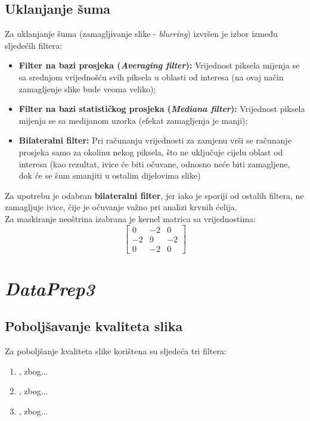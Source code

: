 \documentclass[12pt,a4paper]{article}
\begin{document}
\subsection{Uklanjanje šuma}

Za uklanjanje šuma (zamagljivanje slike - \textit{blurring}) izvršen je izbor između sljedećih filtera:

\begin{itemize}

\item \textbf{Filter na bazi prosjeka (\textit{Averaging filter}):} Vrijednost piksela mijenja se sa srednjom vrijednošću svih piksela u oblasti od interesa (na ovaj način zamagljenje slike bude veoma veliko); 
\item \textbf{Filter na bazi statističkog prosjeka (\textit{Mediana filter}):} Vrijednost piksela mijenja se sa medijanom uzorka (efekat zamagljenja je manji);
\item \textbf{Bilateralni filter:} Pri računanju vrijednosti za zamjenu vrši se računanje prosjeka samo za okolinu nekog piksela, što ne uključuje cijelu oblast od interesa (kao rezultat, ivice će biti očuvane, odnosno neće biti zamagljene, dok će se šum smanjiti u ostalim dijelovima slike)

\end{itemize}

Za upotrebu je odabran \textbf{bilateralni filter}, jer iako je sporiji od ostalih filtera, ne zamagljuje ivice, čije je očuvanje važno pri analizi krvnih ćelija. \\

Za maskiranje neoštrina izabrana je kernel matrica sa vrijednostima:
\[
\begin{bmatrix}
    0 & -2 & 0 \\
    -2 & 9 & -2 \\
    0 & -2 & 0
\end{bmatrix}
\]

\newpage

\section{\textit{DataPrep3}}

\subsection{Poboljšavanje kvaliteta slika}

Za poboljšanje kvaliteta slike korištena su sljedeća tri filtera:

\begin{enumerate}

\item , zbog... 
\item , zbog... 
\item , zbog... 

\end{enumerate}
\end{document}
